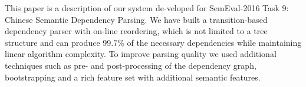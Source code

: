This paper is a description of our system de-veloped for SemEval-2016 Task 9: Chinese Semantic Dependency Parsing. We have built a transition-based dependency parser with on-line reordering, which is not limited to a tree structure and can produce 99.7\% of the necessary dependencies while maintaining linear algorithm complexity. To improve parsing quality we used additional techniques such as pre- and post-processing of the dependency graph, bootstrapping and a rich feature set with additional semantic features.
